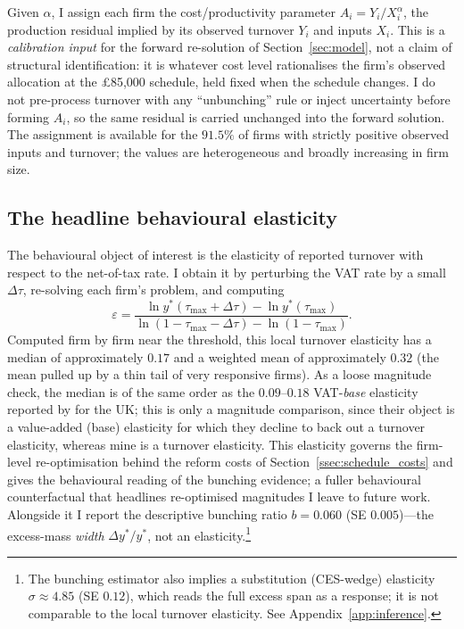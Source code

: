 Given $\alpha$, I assign each firm the cost/productivity parameter
$A_i = Y_i / X_i^{\alpha}$, the production residual implied by its observed
turnover $Y_i$ and inputs $X_i$. This is a \emph{calibration input} for the
forward re-solution of Section~\ref{sec:model}, not a claim of structural
identification: it is whatever cost level rationalises the firm's observed
allocation at the \pounds85{,}000 schedule, held fixed when the schedule changes.
I do not pre-process turnover with any ``unbunching'' rule or inject uncertainty
before forming $A_i$, so the same residual is carried unchanged into the forward
solution. The assignment is available for the $91.5\%$ of firms with strictly
positive observed inputs and turnover; the values are heterogeneous and broadly
increasing in firm size.

\subsection{The headline behavioural elasticity}
\label{ssec:elasticities}

The behavioural object of interest is the elasticity of reported turnover with
respect to the net-of-tax rate. I obtain it by perturbing the VAT rate by a
small $\Delta\tau$, re-solving each firm's problem, and computing
\[
  \varepsilon
  = \frac{\ln y^{*}(\tau_{\max}+\Delta\tau) - \ln y^{*}(\tau_{\max})}
         {\ln(1-\tau_{\max}-\Delta\tau) - \ln(1-\tau_{\max})} .
\]
Computed firm by firm near the threshold, this local turnover elasticity has a
median of approximately $\mathbf{0.17}$ and a weighted mean of approximately
$0.32$ (the mean pulled up by a thin tail of very responsive firms). As a loose
magnitude check, the median is of the same order as the $0.09$--$0.18$
VAT-\emph{base} elasticity reported by \citet{liuetal2021} for the UK; this is
only a magnitude comparison, since their object is a value-added (base) elasticity
for which they decline to back out a turnover elasticity, whereas mine is a
turnover elasticity. This elasticity governs the firm-level re-optimisation behind
the reform costs of Section~\ref{ssec:schedule_costs} and gives the behavioural
reading of the bunching evidence; a fuller behavioural counterfactual that
headlines re-optimised magnitudes I leave to future work. Alongside it I report the
descriptive bunching ratio $b=0.060$
(SE $0.005$)---the excess-mass \emph{width} $\Delta y^{*}/y^{*}$, not an
elasticity.\footnote{The bunching estimator also implies a substitution
(CES-wedge) elasticity $\sigma\approx4.85$ (SE $0.12$), which reads the full
excess span as a response; it is not comparable to the local turnover elasticity.
See Appendix~\ref{app:inference}.}

